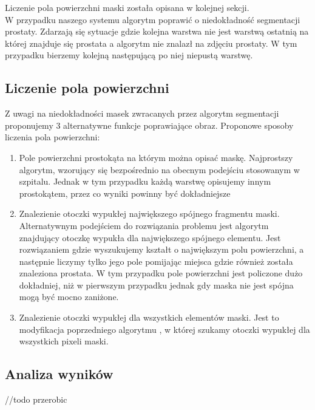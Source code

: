 \documentclass[a4paper,11pt,twoside]{report}
\theoremstyle{definition}
\begin{document}
Liczenie pola powierzchni maski została opisana w kolejnej sekcji. \\
W przypadku naszego systemu algorytm poprawić o niedokładność segmentacji prostaty. Zdarzają się sytuacje gdzie kolejna warstwa nie jest warstwą ostatnią na której znajduje się prostata a algorytm nie znalazł na zdjęciu prostaty. W tym przypadku bierzemy kolejną następującą po niej niepustą warstwę.

\subsection{Liczenie pola powierzchni}
Z uwagi na niedokładności masek zwracanych przez algorytm segmentacji proponujemy 3 alternatywne funkcje poprawiające obraz. Proponowe sposoby liczenia pola powierzchni:
\begin{enumerate}
\item Pole powierzchni prostokąta na którym można opisać maskę. Najprostszy algorytm, wzorujący się bezpośrednio na obecnym podejściu stosowanym w szpitalu. Jednak w tym przypadku każdą warstwę opisujemy innym prostokątem, przez co wyniki powinny być dokładniejsze
\item Znalezienie otoczki wypukłej największego spójnego fragmentu maski. Alternatywnym podejściem do rozwiązania problemu jest algorytm znajdujący otoczkę wypukła dla największego spójnego elementu. Jest rozwiązaniem gdzie wyszukujemy kształt o największym polu powierzchni, a następnie liczymy tylko jego pole pomijając miejsca gdzie również została znaleziona prostata. W tym przypadku pole powierzchni jest policzone dużo dokładniej, niż w pierwszym przypadku jednak gdy maska nie jest spójna mogą być mocno zaniżone. 
\item Znalezienie otoczki wypukłej dla wszystkich elementów maski. Jest to modyfikacja poprzedniego algorytmu , w której szukamy otoczki wypukłej dla wszystkich pixeli maski.
\end{enumerate}

\subsection{Analiza wyników}
//todo przerobic
\end{document}
